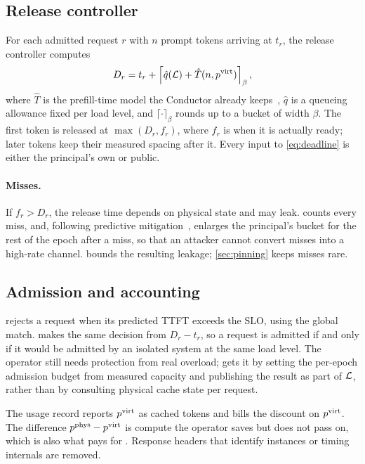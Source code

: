 \subsection{Release controller}
\label{sec:orc}
For each admitted request $r$ with $n$ prompt tokens arriving at $t_r$, the
release controller computes
\begin{equation}
  D_r = t_r + \left\lceil \hat{q}(\mathcal{L}) + \hat{T}(n, p^{\mathrm{virt}}) \right\rceil_{\beta},
  \label{eq:deadline}
\end{equation}
where $\hat{T}$ is the prefill-time model the Conductor already
keeps~\cite{qin2025mooncake}, $\hat{q}$ is a queueing allowance fixed per load
level, and $\lceil\cdot\rceil_\beta$ rounds up to a bucket of width $\beta$.
The first token is released at $\max(D_r, f_r)$, where $f_r$ is when it is
actually ready; later tokens keep their measured spacing after it. Every input
to \cref{eq:deadline} is either the principal's own or public.

\paragraph{Misses.} If $f_r > D_r$, the release time depends on physical state
and may leak. \sys counts every miss, and, following predictive
mitigation~\cite{askarov2010predictive,zhang2011predictive}, enlarges the
principal's bucket for the rest of the epoch after a miss, so that an attacker
cannot convert misses into a high-rate channel.  bounds the
resulting leakage; \cref{sec:pinning} keeps misses rare.

\subsection{Admission and accounting}
\label{sec:admission}
\mc rejects a request when its predicted TTFT exceeds the SLO, using the global
match. \sys makes the same decision from $D_r - t_r$, so a request is admitted
if and only if it would be admitted by an isolated system at the same load
level. The operator still needs protection from real overload; \sys gets it by
setting the per-epoch admission budget from measured capacity and publishing
the result as part of $\mathcal{L}$, rather than by consulting physical cache state
per request.

The usage record reports $p^{\mathrm{virt}}$ as cached tokens and bills the discount on
$p^{\mathrm{virt}}$. The difference $p^{\mathrm{phys}} - p^{\mathrm{virt}}$ is compute the operator saves but does not
pass on, which is also what pays for \sys. Response headers that identify
instances or timing internals are removed.

